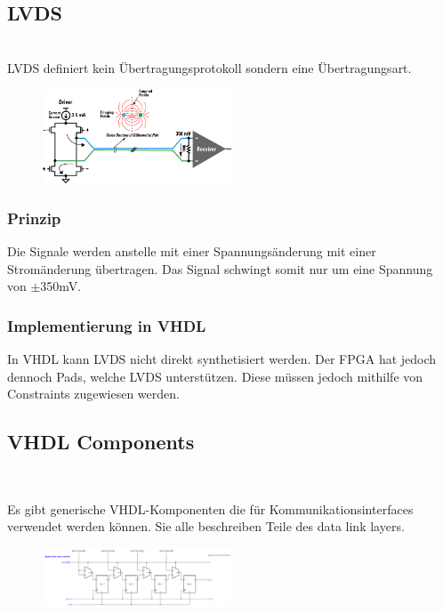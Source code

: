 \subsection{LVDS}$~$ \\
LVDS definiert kein Übertragungsprotokoll sondern eine Übertragungsart.
\begin{multicols}{2}
     \begin{figure}[H]
        \includegraphics[width=0.5\textwidth]{images/lvds.png}
    \end{figure}

    \subsubsection{Prinzip}
    Die Signale werden anstelle mit einer Spannungsänderung mit einer Stromänderung übertragen. Das Signal schwingt somit nur um eine Spannung von $\pm$350mV.

    \subsubsection{Implementierung in VHDL}
    In VHDL kann LVDS nicht direkt synthetisiert werden. Der FPGA hat jedoch dennoch Pads, welche LVDS unterstützen. Diese müssen jedoch mithilfe von Constraints zugewiesen werden.
    
\end{multicols}

\subsection{VHDL Components}$~$ \\
\begin{multicols}{2}
Es gibt generische VHDL-Komponenten die für Kommunikationsinterfaces verwendet werden können. Sie alle beschreiben Teile des data link layers.
\vfill\null
\columnbreak
\begin{figure}[H]
  \includegraphics[width=0.5\textwidth]{images/shiftRegister.png}
\end{figure}
\end{multicols}
